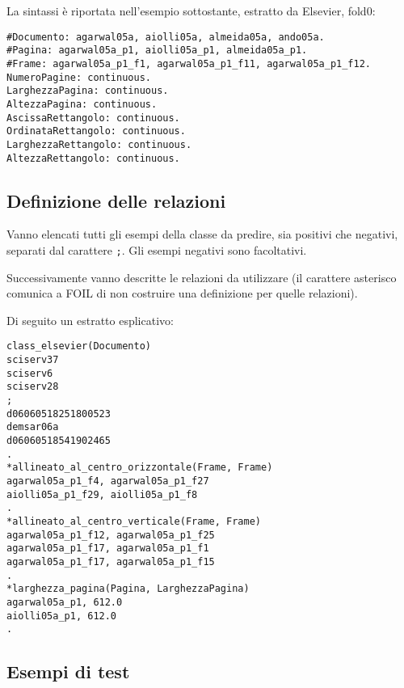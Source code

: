 La sintassi è riportata nell'esempio sottostante, estratto da Elsevier, fold0:
\begin{verbatim}
#Documento: agarwal05a, aiolli05a, almeida05a, ando05a.
#Pagina: agarwal05a_p1, aiolli05a_p1, almeida05a_p1.
#Frame: agarwal05a_p1_f1, agarwal05a_p1_f11, agarwal05a_p1_f12.
NumeroPagine: continuous.
LarghezzaPagina: continuous.
AltezzaPagina: continuous.
AscissaRettangolo: continuous.
OrdinataRettangolo: continuous.
LarghezzaRettangolo: continuous.
AltezzaRettangolo: continuous.
\end{verbatim}

\subsection{Definizione delle relazioni}
Vanno elencati tutti gli esempi della classe da predire, sia positivi che negativi, separati dal carattere \verb+;+.
Gli esempi negativi sono facoltativi.

Successivamente vanno descritte le relazioni da utilizzare (il carattere asterisco comunica a FOIL di non costruire una definizione per quelle relazioni).

Di seguito un estratto esplicativo:

\begin{verbatim}
class_elsevier(Documento)
sciserv37
sciserv6
sciserv28
;
d06060518251800523
demsar06a
d06060518541902465
.
*allineato_al_centro_orizzontale(Frame, Frame)
agarwal05a_p1_f4, agarwal05a_p1_f27
aiolli05a_p1_f29, aiolli05a_p1_f8
.
*allineato_al_centro_verticale(Frame, Frame)
agarwal05a_p1_f12, agarwal05a_p1_f25
agarwal05a_p1_f17, agarwal05a_p1_f1
agarwal05a_p1_f17, agarwal05a_p1_f15
.
*larghezza_pagina(Pagina, LarghezzaPagina)
agarwal05a_p1, 612.0
aiolli05a_p1, 612.0
.
\end{verbatim}


\subsection{Esempi di test}


